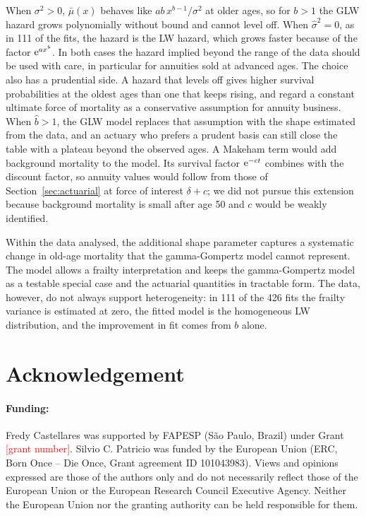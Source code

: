 \documentclass[12pt]{article}
\newcommand{\e}{{\rm e}}         %
\begin{document}
When $\sigma^2>0$, $\bar\mu(x)$ behaves like $ab\,x^{b-1}/\sigma^2$ at older ages, so for $b>1$ the GLW hazard grows polynomially without bound and cannot level off. When $\hat\sigma^2=0$, as in 111 of the fits, the hazard is the LW hazard, which grows faster because of the factor $\e^{ax^b}$. In both cases the hazard implied beyond the range of the data should be used with care, in particular for annuities sold at advanced ages. The choice also has a prudential side. A hazard that levels off gives higher survival probabilities at the oldest ages than one that keeps rising, and \citet{gbari2017extreme} regard a constant ultimate force of mortality as a conservative assumption for annuity business. When $\hat b>1$, the GLW model replaces that assumption with the shape estimated from the data, and an actuary who prefers a prudent basis can still close the table with a plateau beyond the observed ages. A Makeham term \citep{makeham1860law} would add background mortality to the model. Its survival factor $\e^{-ct}$ combines with the discount factor, so annuity values would follow from those of Section~\ref{sec:actuarial} at force of interest $\delta+c$; we did not pursue this extension because background mortality is small after age 50 and $c$ would be weakly identified.

Within the data analysed, the additional shape parameter captures a systematic change in old-age mortality that the gamma-Gompertz model cannot represent. The model allows a frailty interpretation and keeps the gamma-Gompertz model as a testable special case and the actuarial quantities in tractable form. The data, however, do not always support heterogeneity: in 111 of the 426 fits the frailty variance is estimated at zero, the fitted model is the homogeneous LW distribution, and the improvement in fit comes from $b$ alone.


\section*{Acknowledgement}

\paragraph*{Funding:}
Fredy Castellares was supported by FAPESP (S\~ao Paulo, Brazil) under Grant \textcolor{red}{[grant number]}. Silvio C. Patricio was funded by the European Union (ERC, Born Once -- Die Once, Grant agreement ID 101043983). Views and opinions expressed are those of the authors only and do not necessarily reflect those of the European Union or the European Research Council Executive Agency. Neither the European Union nor the granting authority can be held responsible for them.
\end{document}
